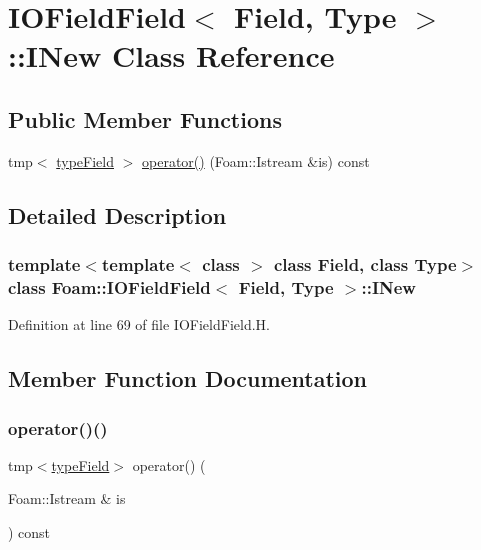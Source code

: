 \hypertarget{classFoam_1_1IOFieldField_1_1INew}{}\section{I\+O\+Field\+Field$<$ Field, Type $>$\+:\+:I\+New Class Reference}
\label{classFoam_1_1IOFieldField_1_1INew}
\subsection*{Public Member Functions}
\begin{DoxyCompactItemize}
\item 
tmp$<$ \hyperlink{classFoam_1_1IOFieldField_a0b5dcbf9bf55b122c23ceb80ebdd07df}{type\+Field} $>$ \hyperlink{classFoam_1_1IOFieldField_1_1INew_a0c19ec309bdf402c78f9e77a46df376e}{operator()} (Foam\+::\+Istream \&is) const
\end{DoxyCompactItemize}


\subsection{Detailed Description}
\subsubsection*{template$<$template$<$ class $>$ class Field, class Type$>$\newline
class Foam\+::\+I\+O\+Field\+Field$<$ Field, Type $>$\+::\+I\+New}



Definition at line 69 of file I\+O\+Field\+Field.\+H.



\subsection{Member Function Documentation}
\mbox{\label{classFoam_1_1IOFieldField_1_1INew_a0c19ec309bdf402c78f9e77a46df376e}} 
\subsubsection{\texorpdfstring{operator()()}{operator()()}}
{\footnotesize\ttfamily tmp$<$\hyperlink{classFoam_1_1IOFieldField_a0b5dcbf9bf55b122c23ceb80ebdd07df}{type\+Field}$>$ operator() (\begin{DoxyParamCaption}\item[{Foam\+::\+Istream \&}]{is }\end{DoxyParamCaption}) const\hspace{0.3cm}{\ttfamily [inline]}}




